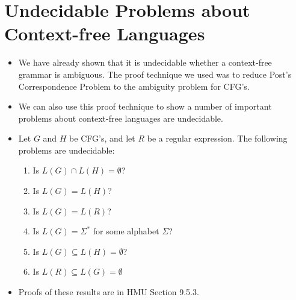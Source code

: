 \documentclass[]{article}
\begin{document}
\section{Undecidable Problems about Context-free Languages}
\begin{itemize}
\item We have already shown that it is undecidable whether a context-free
grammar is ambiguous. The proof technique we used was to reduce Post's
Correspondence Problem to the ambiguity problem for CFG's.
\item We can also use this proof technique to show a number of important
problems about context-free languages are undecidable.
\item Let $G$ and $H$ be CFG's, and let $R$ be a regular expression. The
following problems are undecidable:
\begin{enumerate}
\item Is $L(G) \cap L(H) = \emptyset$?
\item Is $L(G) = L(H)$?
\item Is $L(G) = L(R)$?
\item Is $L(G) = \Sigma^*$ for some alphabet $\Sigma$?
\item Is $L(G) \subseteq L(H) = \emptyset$?
\item Is $L(R) \subseteq L(G) = \emptyset$
\end{enumerate}
\item Proofs of these results are in HMU Section 9.5.3.
\end{itemize}
\end{document}
